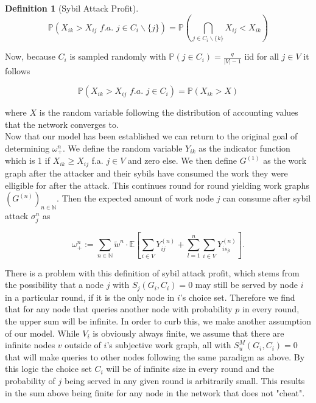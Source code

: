 \documentclass[11pt,a4paper]{report}
\theoremstyle{definition}
\newtheorem{definition}{Definition}[section]
\theoremstyle{theorem}
\theoremstyle{proposition}
\theoremstyle{corollary}
\theoremstyle{lemma}
\theoremstyle{example}
\theoremstyle{remark}
\begin{document}
\begin{definition}[Sybil Attack Profit]
\[
\mathbb{P}(X_{ik}>X_{ij}\,\,\textit{f.a. }j\in{}C_i\backslash\lbrace{}j\rbrace) = \mathbb{P}\left(\bigcap\limits_{j\in{}C_i\backslash\lbrace{}k\rbrace}X_{ij}<{}X_{ik}\right)
\]

\noindent{}Now, because $C_i$ is sampled randomly with $\mathbb{P}(j\in{}C_i)=\frac{q}{|V|-1}$ iid for all $j\in{}V$ it follows 

\[
\mathbb{P}(X_{ik}>X_{ij}\,\,\textit{f.a.}\,\,j\in{}C_i) = \mathbb{P}(X_{ik}>X)
\]

\noindent{}where $X$ is the random variable following the distribution of accounting values that the network converges to. \vspace{1em}\\

\noindent{}Now that our model has been established we can return to the original goal of determining $\omega_{+}^{n}$. We define the random variable $Y_{ik}$ as the indicator function which is 1 if $X_{ik}\geq{}X_{ij}$ f.a. $j\in{}V$ and zero else. We then define $G^{(1)}$ as the work graph after the attacker and their sybils have consumed the work they were elligible for after the attack. This continues round for round yielding work graphs $\left(G^{(n)}\right)_{n\in\mathbb{N}}$. Then the expected amount of work node $j$ can consume after sybil attack $\sigma_j^n$ as 

\[
\omega^n_{+}:=\sum\limits_{n\in\mathbb{N}}\tilde{w}^n\cdot\mathbb{E}\left[\sum\limits_{i\in{}V}Y^{(n)}_{ij}+\sum\limits_{l=1}^{n}\sum\limits_{i\in{}V}Y^{(n)}_{is_{jl}}\right].
\]

\noindent{}There is a problem with this definition of sybil attack profit, which stems from the possibility that a node $j$ with $S_j(G_i,C_i)=0$ may still be served by node $i$ in a particular round, if it is the only node in $i$'s choice set. Therefore we find that for any node that queries another node with probability $p$ in every round, the upper sum will be infinite. In order to curb this, we make another assumption of our model. While $V_i$ is obviously always finite, we assume that there are infinite nodes $v$ outside of $i$'s subjective work graph, all with $S^M_u(G_i,C_i)=0$ that will make queries to other nodes following the same paradigm as above. By this logic the choice set $C_i$ will be of infinite size in every round and the probability of $j$ being served in any given round is arbitrarily small. This results in the sum above being finite for any node in the network that does not "cheat". \vspace{1em}\\ 


\end{definition}
\end{document}
